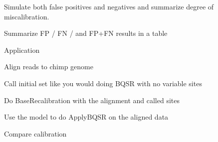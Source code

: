 \documentclass{article}
\begin{document}
\begin{outline}
\begin{outline}
	\end{outline}	
	\item Simulate both false positives and negatives and summarize degree of miscalibration.
	\item Summarize FP / FN / and FP+FN results in a table
	\item Application
	\begin{outline}
		\item Align reads to chimp genome
		\item Call initial set like you would doing BQSR with no variable sites
		\item Do BaseRecalibration with the alignment and called sites
		\item Use the model to do ApplyBQSR on the aligned data
		\item Compare calibration
	\end{outline}
\end{outline}
\end{document}
